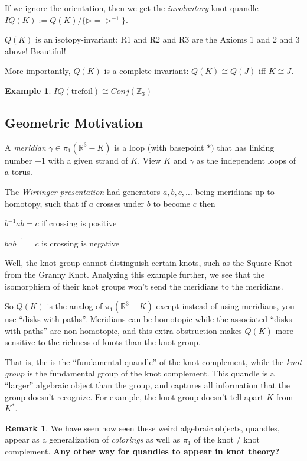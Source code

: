 \documentclass[11pt]{article}
\newcommand{\Z}{\mathbb{Z}}
\newcommand{\R}{\mathbb{R}}
\theoremstyle{plain}
\theoremstyle{definition}
\newtheorem{remark}{Remark}
\newtheorem{ex}{Example}
\begin{document}
If we ignore the orientation, then we get the \textit{involuntary} knot quandle $IQ(K):=Q(K)/\lbrace\rhd=\rhd^{-1}\rbrace$.

\bigskip
$Q(K)$ is an isotopy-invariant: R1 and R2 and R3 are the Axioms 1 and 2 and 3 above! Beautiful!

\bigskip
More importantly, $Q(K)$ is a complete invariant: $Q(K)\cong Q(J)$ iff $K\cong J$.

\begin{ex}
$IQ(\text{trefoil})\cong Conj(\Z_3)$
\end{ex}

\subsection{Geometric Motivation}

A \textit{meridian} $\gamma\in\pi_1(\R^3-K)$ is a loop (with basepoint $\ast)$ that has linking number $+1$ with a given strand of $K$. View $K$ and $\gamma$ as the independent loops of a torus.

The \textit{Wirtinger presentation} had generators $a,b,c,\ldots$ being meridians up to homotopy, such that if $a$ crosses under $b$ to become $c$ then

$b^{-1}ab=c$ if crossing is positive

$bab^{-1}=c$ is crossing is negative

Well, the knot group cannot distinguish certain knots, such as the Square Knot from the Granny Knot. Analyzing this example further, we see that the isomorphism of their knot groups won't send the meridians to the meridians.

\bigskip
So $Q(K)$ is the analog of $\pi_1(\R^3-K)$ except instead of using meridians, you use ``disks with paths''. Meridians can be homotopic while the associated ``disks with paths'' are non-homotopic, and this extra obstruction makes $Q(K)$ more sensitive to the richness of knots than the knot group.

That is, the  is the ``fundamental quandle'' of the knot complement, while the \textit{knot group} is the fundamental group of the knot complement. This quandle is a ``larger'' algebraic object than the group, and captures all information that the group doesn't recognize. For example, the knot group doesn't tell apart $K$ from $K^\ast$.

\begin{remark}
We have seen now seen these weird algebraic objects, quandles, appear as a generalization of \textit{colorings} as well as $\pi_1$ of the knot / knot complement. \textbf{Any other way for quandles to appear in knot theory?}
\end{remark}
\end{document}
